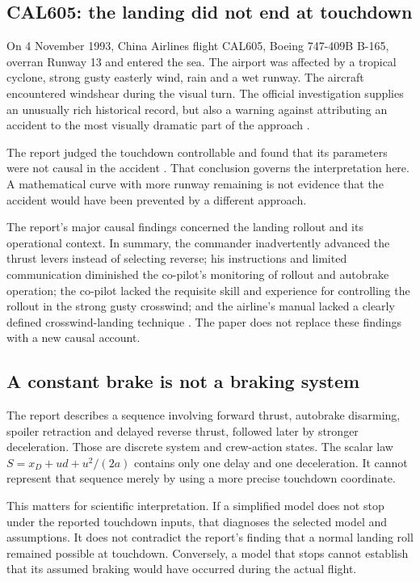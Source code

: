 \label{part:6}
\subsection*{CAL605: the landing did not end at touchdown}
On 4 November 1993, China Airlines flight CAL605, Boeing 747-409B B-165, overran Runway 13 and entered the sea. The airport was affected by a tropical cyclone, strong gusty easterly wind, rain and a wet runway. The aircraft encountered windshear during the visual turn. The official investigation supplies an unusually rich historical record, but also a warning against attributing an accident to the most visually dramatic part of the approach \cite{cad}.

The report judged the touchdown controllable and found that its parameters were not causal in the accident \cite[§2.6.5]{cad}. That conclusion governs the interpretation here. A mathematical curve with more runway remaining is not evidence that the accident would have been prevented by a different approach.

The report's major causal findings concerned the landing rollout and its operational context. In summary, the commander inadvertently advanced the thrust levers instead of selecting reverse; his instructions and limited communication diminished the co-pilot's monitoring of rollout and autobrake operation; the co-pilot lacked the requisite skill and experience for controlling the rollout in the strong gusty crosswind; and the airline's manual lacked a clearly defined crosswind-landing technique \cite[Synopsis; §3]{cad}. The paper does not replace these findings with a new causal account.

\subsection*{A constant brake is not a braking system}
The report describes a sequence involving forward thrust, autobrake disarming, spoiler retraction and delayed reverse thrust, followed later by stronger deceleration. Those are discrete system and crew-action states. The scalar law $S=x_D+ud+u^2/(2a)$ contains only one delay and one deceleration. It cannot represent that sequence merely by using a more precise touchdown coordinate.

This matters for scientific interpretation. If a simplified model does not stop under the reported touchdown inputs, that diagnoses the selected model and assumptions. It does not contradict the report's finding that a normal landing roll remained possible at touchdown. Conversely, a model that stops cannot establish that its assumed braking would have occurred during the actual flight.

